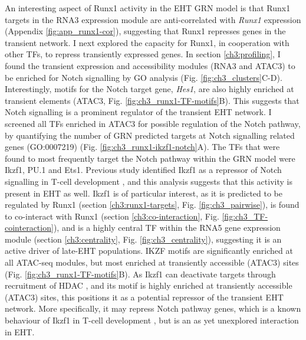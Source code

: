 An interesting aspect of Runx1 activity in the EHT GRN model is that Runx1 targets in the RNA3 expression module are anti-correlated with \textit{Runx1} expression (Appendix \ref{fig:app_runx1-cor}), suggesting that Runx1 represses genes in the transient network. I next explored the capacity for Runx1, in cooperation with other TFs, to repress transiently expressed genes. In section \ref{ch3:profiling}, I found the transient expression and accessibility modules (RNA3 and ATAC3) to be enriched for Notch signalling by GO analysis (Fig. \ref{fig:ch3_clusters}C-D). Interestingly, motifs for the Notch target gene, \textit{Hes1}, are also highly enriched at transient elements (ATAC3, Fig. \ref{fig:ch3_runx1-TF-motifs}B). This suggests that Notch signalling is a prominent regulator of the transient EHT network. I screened all TFs enriched in ATAC3 for possible regulation of the Notch pathway, by quantifying the number of GRN predicted targets at Notch signalling related genes (GO:0007219) (Fig. \ref{fig:ch3_runx1-ikzf1-notch}A). The TFs that were found to most frequently target the Notch pathway within the GRN model were Ikzf1, PU.1 and Ets1. Previous study identified Ikzf1 as a repressor of Notch signalling in T-cell development \citep{kleinmann_ikaros_2008}, and this analysis suggests that this activity is present in EHT as well. Ikzf1 is of particular interest, as it is predicted to be regulated by Runx1 (section \ref{ch3:runx1-targets}, Fig. \ref{fig:ch3_pairwise}), is found to co-interact with Runx1 (section \ref{ch3:co-interaction}, Fig. \ref{fig:ch3_TF-cointeraction}), and is a highly central TF within the RNA5 gene expression module (section \ref{ch3:centrality}, Fig. \ref{fig:ch3_centrality}), suggesting it is an active driver of late-EHT populations. IKZF motifs are significantly enriched at all ATAC-seq modules, but most enriched at transiently accessible (ATAC3) sites (Fig. \ref{fig:ch3_runx1-TF-motifs}B). As Ikzf1 can deactivate targets through recruitment of HDAC \citep{marke_many_2018}, and its motif is highly enriched at transiently accessible (ATAC3) sites, this positions it as a potential repressor of the transient EHT network. More specifically, it may repress Notch pathway genes, which is a known behaviour of Ikzf1 in T-cell development \citep{kleinmann_ikaros_2008}, but is an as yet unexplored interaction in EHT. 

